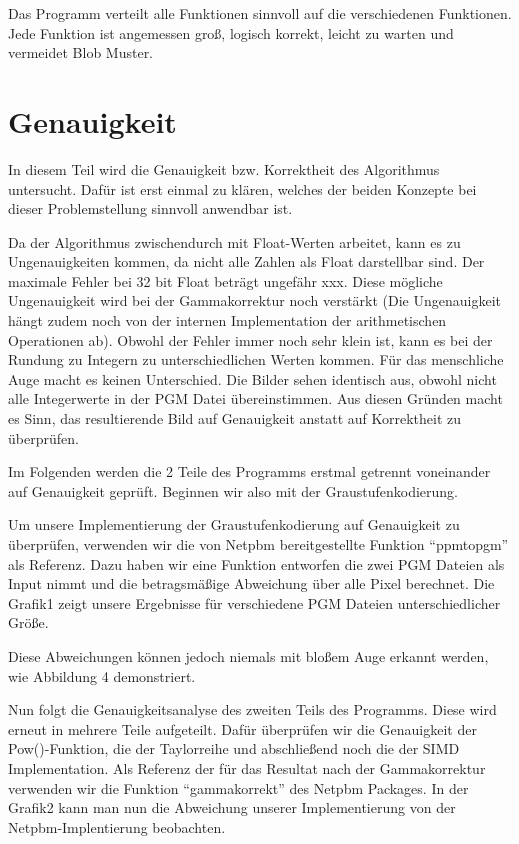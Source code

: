 \documentclass[course=erap]{aspdoc}
\begin{document}
\par
Das Programm verteilt alle Funktionen sinnvoll auf die verschiedenen Funktionen. Jede Funktion ist angemessen groß, logisch korrekt, leicht zu warten und vermeidet Blob Muster.

\section{Genauigkeit}
\par
In diesem Teil wird die Genauigkeit bzw. Korrektheit des Algorithmus untersucht. Dafür ist erst einmal zu klären, welches der beiden Konzepte bei dieser Problemstellung sinnvoll anwendbar ist.

\par
Da der Algorithmus zwischendurch mit Float-Werten arbeitet, kann es zu Ungenauigkeiten kommen, da nicht alle Zahlen als Float darstellbar sind. Der maximale Fehler bei 32 bit Float beträgt ungefähr xxx. Diese mögliche Ungenauigkeit wird bei der Gammakorrektur noch verstärkt (Die Ungenauigkeit hängt zudem noch von der internen Implementation der arithmetischen Operationen ab). Obwohl der Fehler immer noch sehr klein ist, kann es bei der Rundung zu Integern zu unterschiedlichen Werten kommen. Für das menschliche Auge macht es keinen Unterschied. Die Bilder sehen identisch aus, obwohl nicht alle Integerwerte in der PGM Datei übereinstimmen. Aus diesen Gründen macht es Sinn, das resultierende Bild auf Genauigkeit anstatt auf Korrektheit zu überprüfen.

\par
Im Folgenden werden die 2 Teile des Programms erstmal getrennt voneinander auf Genauigkeit geprüft. Beginnen wir also mit der Graustufenkodierung.

\par
Um unsere Implementierung der Graustufenkodierung auf Genauigkeit zu überprüfen, verwenden wir die von Netpbm bereitgestellte Funktion “ppmtopgm” als Referenz. Dazu haben wir eine Funktion entworfen die zwei PGM Dateien als Input nimmt und die betragsmäßige Abweichung über alle Pixel berechnet. Die Grafik1 zeigt unsere Ergebnisse für verschiedene PGM Dateien unterschiedlicher Größe.

\par
Diese Abweichungen können jedoch niemals mit bloßem Auge erkannt werden, wie Abbildung 4 demonstriert.

\par
Nun folgt die Genauigkeitsanalyse des zweiten Teils des Programms. Diese wird erneut in mehrere Teile aufgeteilt. Dafür überprüfen wir die Genauigkeit der Pow()-Funktion, die der Taylorreihe und abschließend noch die der SIMD Implementation. Als Referenz der für das Resultat nach der Gammakorrektur verwenden wir die Funktion “gammakorrekt” des Netpbm Packages. In der Grafik2 kann man nun die Abweichung unserer Implementierung von der Netpbm-Implentierung beobachten.
\end{document}
